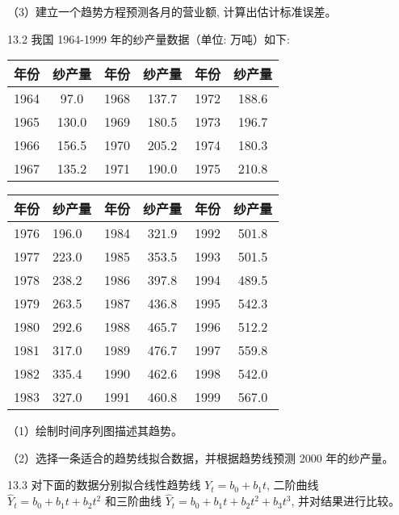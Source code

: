 \documentclass[10pt]{article}
\begin{document}
\begin{CJK*}{UTF8}{bsmi}
（3）建立一个趋势方程预测各月的营业额, 计算出估计标准误差。

13.2 我国 1964-1999 年的纱产量数据（单位: 万吨）如下:

\begin{center}
\begin{tabular}{cc||cc||cc}
\hline
年份 & 纱产量 & 年份 & 纱产量 & 年份 & 纱产量 \\
\hline
1964 & 97.0 & 1968 & 137.7 & 1972 & 188.6 \\
1965 & 130.0 & 1969 & 180.5 & 1973 & 196.7 \\
1966 & 156.5 & 1970 & 205.2 & 1974 & 180.3 \\
1967 & 135.2 & 1971 & 190.0 & 1975 & 210.8 \\
\hline
\end{tabular}
\end{center}

\begin{center}
\begin{tabular}{ll||c|c||cc}
\hline
年份 & 纱产量 & 年份 & 纱产量 & 年份 & 纱产量 \\
\hline
1976 & 196.0 & 1984 & 321.9 & 1992 & 501.8 \\
1977 & 223.0 & 1985 & 353.5 & 1993 & 501.5 \\
1978 & 238.2 & 1986 & 397.8 & 1994 & 489.5 \\
1979 & 263.5 & 1987 & 436.8 & 1995 & 542.3 \\
1980 & 292.6 & 1988 & 465.7 & 1996 & 512.2 \\
1981 & 317.0 & 1989 & 476.7 & 1997 & 559.8 \\
1982 & 335.4 & 1990 & 462.6 & 1998 & 542.0 \\
1983 & 327.0 & 1991 & 460.8 & 1999 & 567.0 \\
\hline
\end{tabular}
\end{center}

（1）绘制时间序列图描述其趋势。

（2）选择一条适合的趋势线拟合数据，并根据趋势线预测 2000 年的纱产量。

13.3 对下面的数据分别拟合线性趋势线 $Y_{t}=b_{0}+b_{1} t$, 二阶曲线 $\hat{Y}_{t}=b_{0}+b_{1} t+b_{2} t^{2}$ 和三阶曲线 $\hat{Y}_{t}=b_{0}+b_{1} t+b_{2} t^{2}+b_{3} t^{3}$, 并对结果进行比较。


\end{CJK*}
\end{document}
